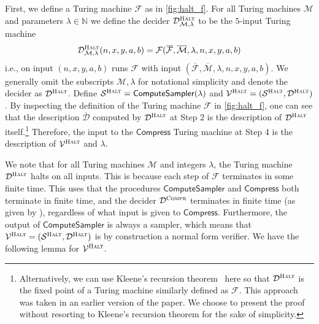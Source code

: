 \documentclass[11pt]{article}
\theoremstyle{definition}
\newcommand{\desc}[1]{\overline{\cal{#1}}}
\newcommand{\sampler}{\mathcal{S}}
\newcommand{\decider}{\mathcal{D}}
\newcommand{\verifier}{\mathcal{V}}
\newcommand{\compr}{\textsc{Compr}}
\newcommand{\halt}{\textsc{Halt}}
\renewcommand{\cal}[1]{\mathcal{#1}}
\newcommand{\tmstyle}[1]{\ensuremath{\mathsf{#1}}}
\newcommand{\Compress}{\tmstyle{Compress}}
\newcommand{\ComputeSampler}{\tmstyle{ComputeSampler}}
\begin{document}
First, we define a Turing machine $\cal{F}$ as in \cref{fig:halt_f}.
For all Turing machines $\cal{M}$ and parameters $\lambda\in\mathbb{N}$ we define the decider
$\decider^\halt_{\cal{M}, \lambda}$ to be the $5$-input Turing machine 
\[
\decider^\halt_{\cal{M}, \lambda}(n,x,y,a,b) = \cal{F}(\desc{F}, \desc{M},
\lambda, n, x, y, a, b)
\]
i.e., on
input $(n, x, y, a, b)$ runs $\cal{F}$ with input $(\desc{F}, \desc{M},
\lambda, n, x, y, a, b)$.
We generally omit the subscripts $\cal{M}, \lambda$ for notational simplicity
and denote the decider as $\decider^\halt$.
Define $\sampler^\halt = \ComputeSampler(\lambda)$ and $\verifier^\halt =
(\sampler^\halt, \decider^\halt)$.
By inspecting the definition of the Turing machine $\cal{F}$ in \cref{fig:halt_f},
one can see that the description $\overline{\decider}$ computed by
$\decider^\halt$ at Step 2 is the description of $\decider^\halt$
itself.\footnote{Alternatively, we can use Kleene's recursion
  theorem~\cite{Kleene1954} here so that $\decider^\halt$ is the fixed point of
  a Turing machine similarly defined as $\cal{F}$.
  This approach was taken in an earlier version of the paper.
  We choose to present the proof without resorting to Kleene's recursion theorem
  for the sake of simplicity.}
Therefore, the input to the $\Compress$ Turing machine at Step 4 is the description of
$\verifier^\halt$ and $\lambda$.

 We note that for all Turing machines $\cal{M}$ and integers $\lambda$, the Turing 
machine $\decider^\halt$ halts on all inputs. This is because each step of $\cal{F}$ terminates in some finite time. This 
uses that the procedures $\ComputeSampler$ and $\Compress$ both terminate in finite time, and the decider
$\decider^\compr$ terminates in finite time (as given by ), regardless of what input is given
to $\Compress$.  Furthermore, the output of $\ComputeSampler$ is always a sampler, which means that $\verifier^\halt = (\sampler^\halt,\decider^\halt)$ is by construction a normal form verifier. We have the following lemma for $\verifier^\halt$.
\end{document}
